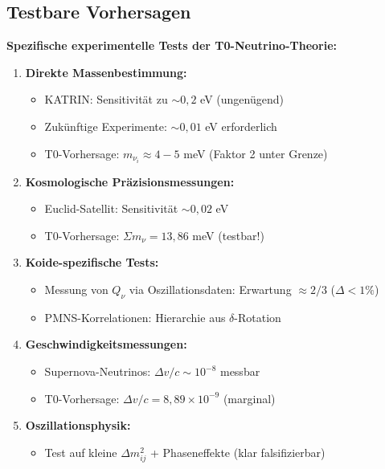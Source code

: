 	\subsection{Testbare Vorhersagen}
	
	\begin{experimental}
		\textbf{Spezifische experimentelle Tests der T0-Neutrino-Theorie:}
		
		\begin{enumerate}
			\item \textbf{Direkte Massenbestimmung:}
			\begin{itemize}
				\item KATRIN: Sensitivität zu $\sim 0,2$ eV (ungenügend)
				\item Zukünftige Experimente: $\sim 0,01$ eV erforderlich
				\item T0-Vorhersage: $m_{\nu_i} \approx 4-5$ meV (Faktor 2 unter Grenze)
			\end{itemize}
			
			\item \textbf{Kosmologische Präzisionsmessungen:}
			\begin{itemize}
				\item Euclid-Satellit: Sensitivität $\sim 0,02$ eV
				\item T0-Vorhersage: $\Sigma m_\nu = 13,86$ meV (testbar!)
			\end{itemize}
			
			\item \textbf{Koide-spezifische Tests:}
			\begin{itemize}
				\item Messung von $Q_\nu$ via Oszillationsdaten: Erwartung $\approx 2/3$ ($\Delta <1\%$)
				\item PMNS-Korrelationen: Hierarchie aus $\delta$-Rotation
			\end{itemize}
			
			\item \textbf{Geschwindigkeitsmessungen:}
			\begin{itemize}
				\item Supernova-Neutrinos: $\Delta v/c \sim 10^{-8}$ messbar
				\item T0-Vorhersage: $\Delta v/c = 8,89 \times 10^{-9}$ (marginal)
			\end{itemize}
			
			\item \textbf{Oszillationsphysik:}
			\begin{itemize}
				\item Test auf kleine $\Delta m^2_{ij}$ + Phaseneffekte (klar falsifizierbar)
			\end{itemize}
		\end{enumerate}
	\end{experimental}
	
